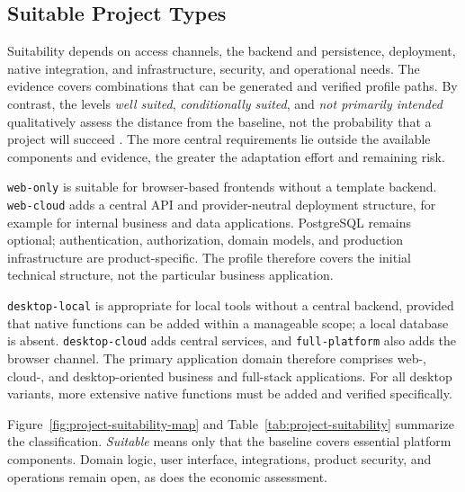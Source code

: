 \subsection{Suitable Project Types}
\label{subsec:geeignete-projekttypen}

Suitability depends on access channels, the backend and persistence,
deployment, native integration, and infrastructure, security, and operational
needs. The evidence covers combinations that can be generated and verified
profile paths.
By contrast, the levels \emph{well suited}, \emph{conditionally suited},
and \emph{not primarily intended} qualitatively assess the distance from the
baseline, not the probability that a project will succeed
\parencite{kleiveist2026profiles,kleiveist2026acceptance}.
The more central requirements lie outside the available components and
evidence, the greater the adaptation effort and remaining risk.

\texttt{web-only} is suitable for browser-based frontends without a template
backend. \texttt{web-cloud} adds a central API and provider-neutral deployment
structure, for example for internal business and data applications.
PostgreSQL remains optional; authentication, authorization, domain models, and
production infrastructure are product-specific.
The profile therefore covers the initial technical structure, not the
particular business application.

\texttt{desktop-local} is appropriate for local tools without a central
backend, provided that native functions can be added within a manageable
scope; a local database is absent. \texttt{desktop-cloud} adds central
services, and \texttt{full-platform} also adds the browser channel. The
primary application domain therefore comprises web-, cloud-, and
desktop-oriented business and full-stack applications.
For all desktop variants, more extensive native functions must be added and
verified specifically.



Figure~\ref{fig:project-suitability-map} and
Table~\ref{tab:project-suitability} summarize the classification.
\emph{Suitable} means only that the baseline covers essential platform
components. Domain logic, user interface, integrations, product security, and
operations remain open, as does the economic assessment.


